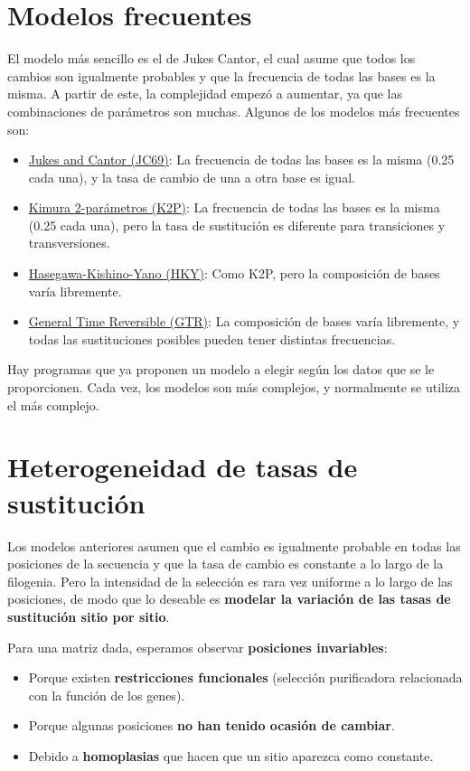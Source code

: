\section{Modelos frecuentes}
El modelo más sencillo es el de Jukes Cantor, el cual asume que todos los cambios son igualmente probables y que la frecuencia de todas las bases es la misma. A partir de este, la complejidad empezó a aumentar, ya que las combinaciones de parámetros son muchas. Algunos de los modelos más frecuentes son: \begin{itemize}
\item \underline{Jukes and Cantor (JC69)}: La frecuencia de todas las bases es la misma (0.25 cada una), y la tasa de cambio de una a otra base es igual.
\item \underline{Kimura 2-parámetros (K2P)}: La frecuencia de todas las bases es la misma (0.25 cada una), pero la tasa de sustitución es diferente para transiciones y transversiones.
\item \underline{Hasegawa-Kishino-Yano (HKY)}: Como K2P, pero la composición de bases varía libremente.
\item \underline{General Time Reversible (GTR)}: La composición de bases varía libremente, y todas las sustituciones posibles pueden tener distintas frecuencias. 
\end{itemize}

Hay programas que ya proponen un modelo a elegir según los datos que se le proporcionen. Cada vez, los modelos son más complejos, y normalmente se utiliza el más complejo. 

\section{Heterogeneidad de tasas de sustitución}
Los modelos anteriores asumen que el cambio es igualmente probable en todas las posiciones de la secuencia y que la tasa de cambio es constante a lo largo de la filogenia. Pero la intensidad de la selección es rara vez uniforme a lo largo de las posiciones, de modo que lo deseable es \textbf{modelar la variación de las tasas de sustitución sitio por sitio}.

Para una matriz dada, esperamos observar \textbf{posiciones invariables}: \begin{itemize}
\item Porque existen \textbf{restricciones funcionales} (selección purificadora relacionada con la función de los genes).
\item Porque algunas posiciones \textbf{no han tenido ocasión de cambiar}.
\item Debido a \textbf{homoplasias} que hacen que un sitio aparezca como constante.
\end{itemize}

